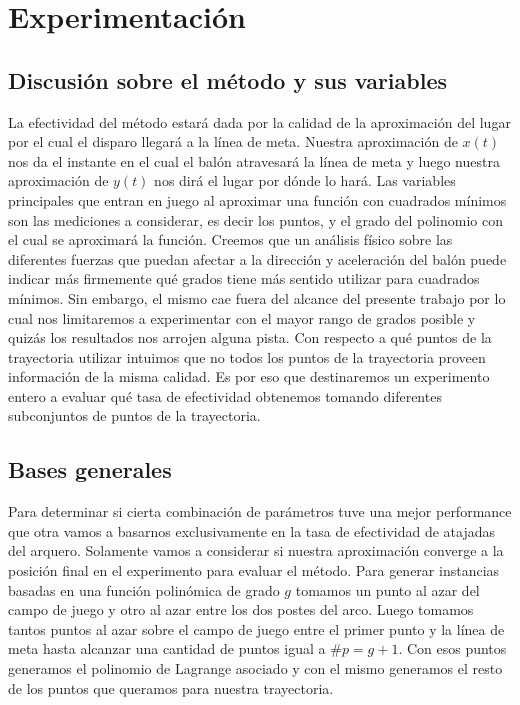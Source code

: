 \section{Experimentación}

\subsection{Discusión sobre el método y sus variables}
La efectividad del método estará dada por la calidad de la aproximación del lugar por el cual el disparo llegará a la línea de meta. 
Nuestra aproximación de $x(t)$ nos da el instante en el cual el balón atravesará la línea de meta y luego nuestra aproximación
de $y(t)$ nos dirá el lugar por dónde lo hará. Las variables principales que entran en juego al aproximar una función con 
cuadrados mínimos son las mediciones a considerar, es decir los puntos, y el grado del polinomio con el cual se aproximará la función.
Creemos que un análisis físico sobre las diferentes fuerzas que puedan afectar a la dirección y aceleración del balón puede indicar 
más firmemente qué grados tiene más sentido utilizar para cuadrados mínimos. Sin embargo, el mismo cae fuera del alcance del presente 
trabajo por lo cual nos limitaremos a experimentar con el mayor rango de grados posible y quizás los resultados nos arrojen alguna pista.
Con respecto a qué puntos de la trayectoria utilizar intuimos que no todos los puntos de la trayectoria proveen información de la misma 
calidad. Es por eso que destinaremos un experimento entero a evaluar qué tasa de efectividad obtenemos tomando diferentes subconjuntos 
de puntos de la trayectoria.

\subsection{Bases generales}
Para determinar si cierta combinación de parámetros tuve una mejor performance que otra vamos a basarnos exclusivamente en la tasa de
efectividad de atajadas del arquero. Solamente vamos a considerar si nuestra aproximación converge a la posición final en el experimento
para evaluar el método.
Para generar instancias basadas en una función polinómica de grado $g$ tomamos un punto al azar del campo de juego y otro al azar entre los dos postes 
del arco. Luego tomamos tantos puntos al azar sobre el campo de juego entre el primer punto y la línea de meta hasta alcanzar una cantidad
de puntos igual a $\#p = g + 1$. Con esos puntos generamos el polinomio de Lagrange asociado y con el mismo generamos el resto de los puntos
que queramos para nuestra trayectoria.


